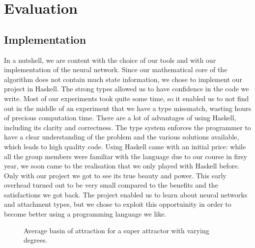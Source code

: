 \chapter{Evaluation}




\section{Implementation}


In a nutshell, we are content with the choice of our tools and with our implementation of the neural network. Since our mathematical core of the algorithm does not contain much state information, we chose to implement our project in Haskell.
The strong types allowed us to have confidence in the code we write. Most of our experiments took quite some time, so it enabled us to not find out in the middle of an experiment that we have a type missmatch, wasting hours of precious computation time.
There are a lot of advantages of using Haskell, including its clarity and correctness. The type system enforces the programmer to have a clear understanding of the problem and the various solutions available, which leads to high quality code.
Using Haskell came with an initial price: while all the group members were familiar with the language due to our course in firsy year, we soon came to the realisation that we only played with Haskell before. Only with our project we got to see its true beauty and power.
This early overhead turned out to be very small compared to the benefits and the satisfactions we got back. The project enabled us to learn about neural networks and attachment types, but we chose to exploit this opportuinity in order to become better using a programming language we like.
\begin{figure}[h]
  \centering

\caption{Average basin of attraction for a super attractor with varying degrees.}
\label{fig:Haskell Proficieny Index over time}
\end{figure}

